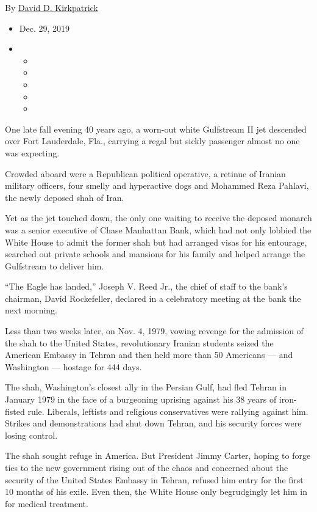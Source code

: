 By \href{https://www.nytimes.com/by/david-d-kirkpatrick}{David D.
Kirkpatrick}

\begin{itemize}
\item
  Dec. 29, 2019
\item
  \begin{itemize}
  \item
  \item
  \item
  \item
  \item
  \end{itemize}
\end{itemize}

One late fall evening 40 years ago, a worn-out white Gulfstream II jet
descended over Fort Lauderdale, Fla., carrying a regal but sickly
passenger almost no one was expecting.

Crowded aboard were a Republican political operative, a retinue of
Iranian military officers, four smelly and hyperactive dogs and Mohammed
Reza Pahlavi, the newly deposed shah of Iran.

Yet as the jet touched down, the only one waiting to receive the deposed
monarch was a senior executive of Chase Manhattan Bank, which had not
only lobbied the White House to admit the former shah but had arranged
visas for his entourage, searched out private schools and mansions for
his family and helped arrange the Gulfstream to deliver him.

``The Eagle has landed,'' Joseph V. Reed Jr., the chief of staff to the
bank's chairman, David Rockefeller, declared in a celebratory meeting at
the bank the next morning.

Less than two weeks later, on Nov. 4, 1979, vowing revenge for the
admission of the shah to the United States, revolutionary Iranian
students seized the American Embassy in Tehran and then held more than
50 Americans --- and Washington --- hostage for 444 days.

The shah, Washington's closest ally in the Persian Gulf, had fled Tehran
in January 1979 in the face of a burgeoning uprising against his 38
years of iron-fisted rule. Liberals, leftists and religious
conservatives were rallying against him. Strikes and demonstrations had
shut down Tehran, and his security forces were losing control.

The shah sought refuge in America. But President Jimmy Carter, hoping to
forge ties to the new government rising out of the chaos and concerned
about the security of the United States Embassy in Tehran, refused him
entry for the first 10 months of his exile. Even then, the White House
only begrudgingly let him in for medical treatment.

